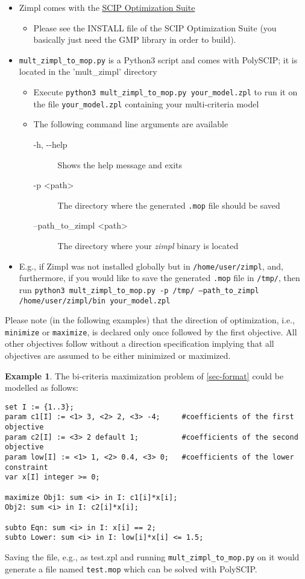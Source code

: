 \documentclass[11pt,listof=totoc]{scrartcl}
\theoremstyle{definition}
\newtheorem{ex}{Example}[section]
\begin{document}
\begin{itemize}
\item Zimpl comes with the \href{http://scip.zib.de/#scipoptsuite}{SCIP Optimization Suite}
\begin{itemize}
\item Please see the INSTALL file of the SCIP Optimization Suite (you
  basically just need the GMP library in order to build).
\end{itemize}
\item \texttt{mult\_zimpl\_to\_mop.py} is a Python3 script and comes with PolySCIP; it is located in the 'mult\_zimpl' directory
\begin{itemize}
\item Execute \texttt{python3 mult\_zimpl\_to\_mop.py your\_model.zpl} to run it on the file \texttt{your\_model.zpl} containing your multi-criteria model
\item The following command line arguments are available
\begin{description}
\item[-h, -{}-help] Shows the help message and exits
\item[-p <path>] The directory where the generated \texttt{.mop} file should be saved
\item[--path\_to\_zimpl <path>] The directory where your \emph{zimpl} binary is located
\end{description}
\end{itemize}
\item[] E.g., if Zimpl was not installed globally but in
  \texttt{/home/user/zimpl}, and, furthermore, if you would like to save
  the generated \texttt{.mop} file in \texttt{/tmp/}, then run
  \texttt{python3 mult\_zimpl\_to\_mop.py -p /tmp/ --path\_to\_zimpl
    /home/user/zimpl/bin your\_model.zpl}
\end{itemize}

Please note (in the following examples) that the direction of optimization,
i.e., \texttt{minimize} or \texttt{maximize}, is declared only once
followed by the first objective. All other objectives follow without a
direction specification implying that all objectives are assumed to be
either minimized or maximized.

\begin{ex}
The bi-criteria maximization problem of \cref{sec-format} could be modelled as follows:
\begin{verbatim}
set I := {1..3};
param c1[I] := <1> 3, <2> 2, <3> -4;     #coefficients of the first objective
param c2[I] := <3> 2 default 1;          #coefficients of the second objective
param low[I] := <1> 1, <2> 0.4, <3> 0;   #coefficients of the lower constraint
var x[I] integer >= 0;

maximize Obj1: sum <i> in I: c1[i]*x[i];
Obj2: sum <i> in I: c2[i]*x[i];

subto Eqn: sum <i> in I: x[i] == 2;
subto Lower: sum <i> in I: low[i]*x[i] <= 1.5;
\end{verbatim}
Saving the file, e.g., as test.zpl and running \texttt{mult\_zimpl\_to\_mop.py} on it would generate a file named \texttt{test.mop} which can be solved with PolySCIP.
\end{ex}
\end{document}
